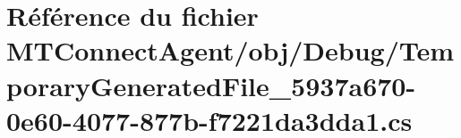 \hypertarget{_m_t_connect_agent_2obj_2_debug_2_temporary_generated_file__5937a670-0e60-4077-877b-f7221da3dda1_8cs}{}\section{Référence du fichier M\+T\+Connect\+Agent/obj/\+Debug/\+Temporary\+Generated\+File\+\_\+5937a670-\/0e60-\/4077-\/877b-\/f7221da3dda1.cs}
\label{_m_t_connect_agent_2obj_2_debug_2_temporary_generated_file__5937a670-0e60-4077-877b-f7221da3dda1_8cs}
